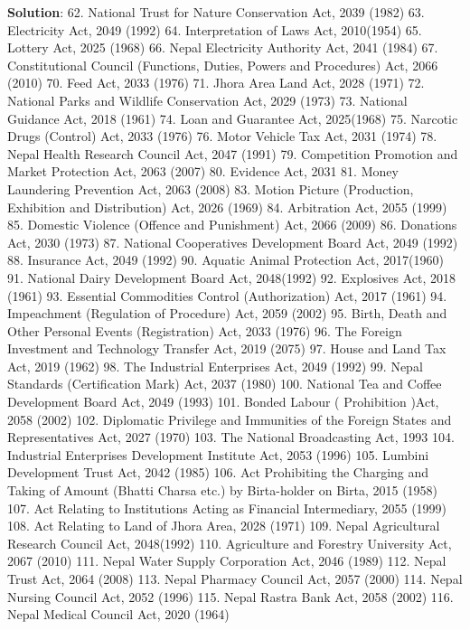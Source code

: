 \documentclass[
]{book}
\newenvironment{solution}{ {\bfseries Solution}:}{}
\begin{document}
\begin{questions}
\begin{solution}
62. National Trust for Nature Conservation Act, 2039 (1982)
63. Electricity Act, 2049 (1992)
64. Interpretation of Laws Act, 2010(1954)
65. Lottery Act, 2025 (1968)
66. Nepal Electricity Authority Act, 2041 (1984)
67. Constitutional Council (Functions, Duties, Powers and Procedures) Act, 2066 (2010)
70. Feed Act, 2033 (1976)
71. Jhora Area Land Act, 2028 (1971)
72. National Parks and Wildlife Conservation Act, 2029 (1973)
73. National Guidance Act, 2018 (1961)
74. Loan and Guarantee Act, 2025(1968)
75. Narcotic Drugs (Control) Act, 2033 (1976)
76. Motor Vehicle Tax Act, 2031 (1974)
78. Nepal Health Research Council Act, 2047 (1991)
79. Competition Promotion and Market Protection Act, 2063 (2007)
80. Evidence Act, 2031
81. Money Laundering Prevention Act, 2063 (2008)
83. Motion Picture (Production, Exhibition and Distribution) Act, 2026 (1969)
84. Arbitration Act, 2055 (1999)
85. Domestic Violence (Offence and Punishment) Act, 2066 (2009)
86. Donations Act, 2030 (1973)
87. National Cooperatives Development Board Act, 2049 (1992)
88. Insurance Act, 2049 (1992)
90. Aquatic Animal Protection Act, 2017(1960)
91. National Dairy Development Board Act, 2048(1992)
92. Explosives Act, 2018 (1961)
93. Essential Commodities Control (Authorization) Act, 2017 (1961)
94. Impeachment (Regulation of Procedure) Act, 2059 (2002)
95. Birth, Death and Other Personal Events (Registration) Act, 2033 (1976)
96. The Foreign Investment and Technology Transfer Act, 2019 (2075)
97. House and Land Tax Act, 2019 (1962)
98. The Industrial Enterprises Act, 2049 (1992)
99. Nepal Standards (Certification Mark) Act, 2037 (1980)
100. National Tea and Coffee Development Board Act, 2049 (1993)
101. Bonded Labour ( Prohibition )Act, 2058 (2002)
102. Diplomatic Privilege and Immunities of the Foreign States and Representatives Act, 2027 (1970)
103. The National Broadcasting Act, 1993
104. Industrial Enterprises Development Institute Act, 2053 (1996)
105. Lumbini Development Trust Act, 2042 (1985)
106. Act Prohibiting the Charging and Taking of Amount (Bhatti Charsa etc.) by Birta-holder on Birta, 2015 (1958)
107. Act Relating to Institutions Acting as Financial Intermediary, 2055 (1999)
108. Act Relating to Land of Jhora Area, 2028 (1971)
109. Nepal Agricultural Research Council Act, 2048(1992)
110. Agriculture and Forestry University Act, 2067 (2010)
111. Nepal Water Supply Corporation Act, 2046 (1989)
112. Nepal Trust Act, 2064 (2008)
113. Nepal Pharmacy Council Act, 2057 (2000)
114. Nepal Nursing Council Act, 2052 (1996)
115. Nepal Rastra Bank Act, 2058 (2002)
116. Nepal Medical Council Act, 2020 (1964)

\end{solution}
\end{questions}
\end{document}
